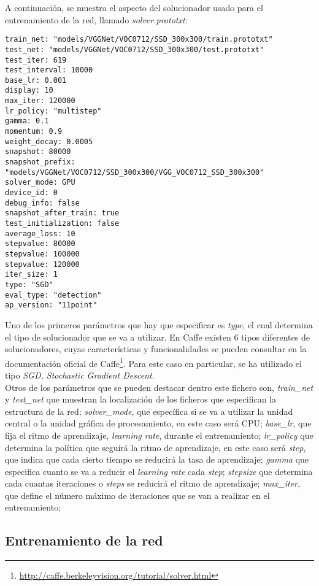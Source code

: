 \documentclass[a4paper, 12pt, spanish, chapterprefix, numbers=noenddot]{book}
\begin{document}
A continuación, se muestra el aspecto del solucionador usado para el entrenamiento de la red, llamado \textit{solver.prototxt}:\\

\begin{lstlisting}[frame=single]
train_net: "models/VGGNet/VOC0712/SSD_300x300/train.prototxt"
test_net: "models/VGGNet/VOC0712/SSD_300x300/test.prototxt"
test_iter: 619
test_interval: 10000
base_lr: 0.001
display: 10
max_iter: 120000
lr_policy: "multistep"
gamma: 0.1
momentum: 0.9
weight_decay: 0.0005
snapshot: 80000
snapshot_prefix: "models/VGGNet/VOC0712/SSD_300x300/VGG_VOC0712_SSD_300x300"
solver_mode: GPU
device_id: 0
debug_info: false
snapshot_after_train: true
test_initialization: false
average_loss: 10
stepvalue: 80000
stepvalue: 100000
stepvalue: 120000
iter_size: 1
type: "SGD"
eval_type: "detection"
ap_version: "11point"
\end{lstlisting}

Uno de los primeros parámetros que hay que especificar es \textit{type}, el cual determina el tipo de solucionador que se va a utilizar. En Caffe existen 6 tipos diferentes de solucionadores, cuyas características y funcionalidades se pueden consultar en la documentación oficial de Caffe\footnote{\url{http://caffe.berkeleyvision.org/tutorial/solver.html}}. Para este caso en particular, se ha utilizado el tipo \textit{SGD, Stochastic Gradient Descent}.\\

Otros de los parámetros que se pueden destacar dentro este fichero son, \textit{train\_net} y \textit{test\_net} que muestran la localización de los ficheros que especifican la estructura de la red; \textit{solver\_mode}, que específica si se va a utilizar la unidad central o la unidad gráfica de procesamiento, en este caso será CPU; \textit{base\_lr}, que fija el ritmo de aprendizaje, \textit{learning rate}, durante el entrenamiento; \textit{lr\_policy} que determina la política que seguirá la ritmo de aprendizaje, en este caso será \textit{step}, que indica que cada cierto tiempo se reducirá la tasa de aprendizaje; \textit{gamma} que especifica cuanto se va a reducir el \textit{learning rate} cada \textit{step}; \textit{stepsize} que determina cada cuantas iteraciones o \textit{steps} se reducirá el ritmo de aprendizaje; \textit{max\_iter}, que define el número máximo de iteraciones que se van a realizar en el entrenamiento;

\subsection{Entrenamiento de la red}
\end{document}
